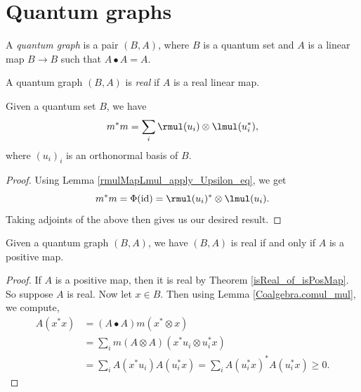 \chapter{Quantum graphs}

\begin{definition}\label{QuantumGraph}
 \leanok
 A \textit{quantum graph} is a pair $(B,A)$, where $B$ is a quantum set and $A$ is a linear map $B\to B$ such that $A\bullet A=A$.
\end{definition}

\begin{definition}\label{QuantumGraph.Real}
 \leanok
 A quantum graph $(B,A)$ is \textit{real} if $A$ is a real linear map.
\end{definition}

\begin{lemma}\label{Coalgebra.comul_mul}
 \leanok
 Given a quantum set $B$, we have
 \[m^*m=\sum_i\rmul(u_i)\otimes\lmul(u_i^*),\]
 where $(u_i)_i$ is an orthonormal basis of $B$.
\end{lemma}
\begin{proof}\leanok
 Using Lemma \ref{rmulMapLmul_apply_Upsilon_eq}, we get
 \[m^*m=\Phi(\operatorname{id})=\rmul(u_i)^*\otimes\lmul(u_i).\]
 Taking adjoints of the above then gives us our desired result.
\end{proof}

\begin{lemma}\label{QuantumGraph.Real.isPosMap}
 \leanok
 Given a quantum graph $(B,A)$, we have $(B,A)$ is real if and only if $A$ is a positive map.
\end{lemma}
\begin{proof}\leanok
 If $A$ is a positive map, then it is real by Theorem \ref{isReal_of_isPosMap}.
 So suppose $A$ is real. Now let $x\in{B}$. Then using Lemma \ref{Coalgebra.comul_mul}, we compute,
 \begin{align*}
  A(x^*x) &= (A \bullet A)m(x^*\otimes x)\\
  &= \sum_im(A\otimes A)(x^*u_i\otimes u_i^*x)\\
  &= \sum_iA(x^*u_i)A(u_i^*x)=\sum_i{A(u_i^*x)}^*A(u_i^*x) \geq0.
 \end{align*}
\end{proof}


